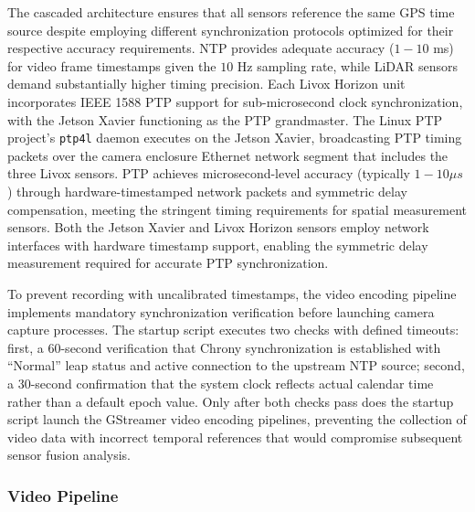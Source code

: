 The cascaded architecture ensures that all sensors reference the same GPS time source despite employing different synchronization protocols optimized for their respective accuracy requirements.
\ac{NTP} provides adequate accuracy ($1-10$ ms) for video frame timestamps given the $10$ Hz sampling rate, while LiDAR sensors demand substantially higher timing precision. 
Each Livox Horizon unit incorporates IEEE 1588 \ac{PTP} support for sub-microsecond clock synchronization, with the Jetson Xavier functioning as the \ac{PTP} grandmaster. 
The Linux \ac{PTP} project's \texttt{ptp4l} daemon executes on the Jetson Xavier, broadcasting \ac{PTP} timing packets over the camera enclosure Ethernet network segment that includes the three Livox sensors. 
\ac{PTP} achieves microsecond-level accuracy (typically $1-10 \mu s$) through hardware-timestamped network packets and symmetric delay compensation, meeting the stringent timing requirements for spatial measurement sensors. 
Both the Jetson Xavier and Livox Horizon sensors employ network interfaces with hardware timestamp support, enabling the symmetric delay measurement required for accurate \ac{PTP} synchronization.

To prevent recording with uncalibrated timestamps, the video encoding pipeline implements mandatory synchronization verification before launching camera capture processes. The startup script executes two checks with defined timeouts: first, a 60-second verification that Chrony synchronization is established with ``Normal'' leap status and active connection to the upstream \ac{NTP} source; second, a 30-second confirmation that the system clock reflects actual calendar time rather than a default epoch value. Only after both checks pass does the startup script launch the GStreamer video encoding pipelines, preventing the collection of video data with incorrect temporal references that would compromise subsequent sensor fusion analysis.
            
\subsubsection{Video Pipeline} \label{video pipeline}
            
